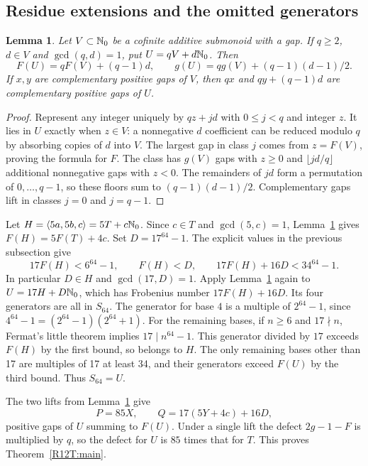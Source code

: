 \documentclass[11pt,a4paper]{article}
\newtheorem{SourceRbcTlemma}[SourceRbcTtheorem]{Lemma}
\begin{document}
\subsection{Residue extensions and the omitted generators}
\begin{SourceRbcTlemma}\label{R12T:glue}
Let $V\subset\mathbb N_0$ be a cofinite additive submonoid with a gap. If $q\ge2$, $d\in V$ and $\gcd(q,d)=1$, put $U=qV+d\mathbb N_0$. Then
\[
F(U)=qF(V)+(q-1)d,\qquad
g(U)=qg(V)+(q-1)(d-1)/2 .
\]
If $x,y$ are complementary positive gaps of $V$, then $qx$ and $qy+(q-1)d$ are complementary positive gaps of $U$.
\end{SourceRbcTlemma}
\begin{proof}
Represent any integer uniquely by $qz+jd$ with $0\le j<q$ and integer $z$. It lies in $U$ exactly when $z\in V$: a nonnegative $d$ coefficient can be reduced modulo $q$ by absorbing copies of $d$ into $V$. The largest gap in class $j$ comes from $z=F(V)$, proving the formula for $F$. The class has $g(V)$ gaps with $z\ge0$ and $\lfloor jd/q\rfloor$ additional nonnegative gaps with $z<0$. The remainders of $jd$ form a permutation of $0,\ldots,q-1$, so these floors sum to $(q-1)(d-1)/2$. Complementary gaps lift in classes $j=0$ and $j=q-1$.
\end{proof}

Let $H=\langle5a,5b,c\rangle=5T+c\mathbb N_0$. Since $c\in T$ and $\gcd(5,c)=1$, Lemma~\ref{R12T:glue} gives $F(H)=5F(T)+4c$. Set $D=17^{64}-1$. The explicit values in the previous subsection give
\[
17F(H)<6^{64}-1,\qquad F(H)<D,\qquad 17F(H)+16D<34^{64}-1.
\]
In particular $D\in H$ and $\gcd(17,D)=1$. Apply Lemma~\ref{R12T:glue} again to $U=17H+D\mathbb N_0$, which has Frobenius number $17F(H)+16D$. Its four generators are all in $S_{64}$. The generator for base $4$ is a multiple of $2^{64}-1$, since $4^{64}-1=(2^{64}-1)(2^{64}+1)$. For the remaining bases, if $n\ge6$ and $17\nmid n$, Fermat's little theorem implies $17\mid n^{64}-1$. This generator divided by $17$ exceeds $F(H)$ by the first bound, so belongs to $H$. The only remaining bases other than 17 are multiples of 17 at least 34, and their generators exceed $F(U)$ by the third bound. Thus $S_{64}=U$.

The two lifts from Lemma~\ref{R12T:glue} give
\[
P=85X,\qquad Q=17(5Y+4c)+16D,
\]
positive gaps of $U$ summing to $F(U)$. Under a single lift the defect $2g-1-F$ is multiplied by $q$, so the defect for $U$ is $85$ times that for $T$. This proves Theorem~\ref{R12T:main}.
\end{document}
